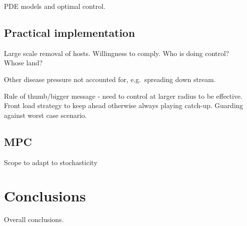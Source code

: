PDE models and optimal control.

\subsection{Practical implementation}

Large scale removal of hosts. Willingness to comply. Who is doing control? Whose land?

Other disease pressure not accounted for, e.g.\ spreading down stream.

Rule of thumb/bigger message - need to control at larger radius to be effective. Front load strategy to keep ahead otherwise always playing catch-up. Guarding against worst case scenario.

\subsection{MPC}

Scope to adapt to stochasticity

\section{Conclusions}

Overall conclusions.